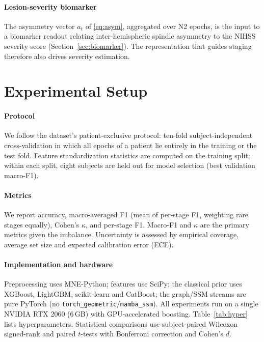\documentclass[journal]{IEEEtran}
\begin{document}
\paragraph{Lesion-severity biomarker}
The asymmetry vector $a_t$ of \eqref{eq:asym}, aggregated over N2 epochs, is the
input to a biomarker readout relating inter-hemispheric spindle asymmetry to the
NIHSS severity score (Section~\ref{sec:biomarker}). The representation that
guides staging therefore also drives severity estimation.

\section{Experimental Setup}
\label{sec:setup}

\paragraph{Protocol}
We follow the dataset's patient-exclusive protocol: ten-fold subject-independent
cross-validation in which all epochs of a patient lie entirely in the training or
the test fold. Feature standardization statistics are computed on the training
split; within each split, eight subjects are held out for model selection (best
validation macro-F1).

\paragraph{Metrics}
We report accuracy, macro-averaged F1 (mean of per-stage F1, weighting rare stages
equally), Cohen's $\kappa$, and per-stage F1. Macro-F1 and $\kappa$ are the primary
metrics given the imbalance. Uncertainty is assessed by empirical coverage, average
set size and expected calibration error (ECE).

\paragraph{Implementation and hardware}
Preprocessing uses MNE-Python; features use SciPy; the classical prior uses
XGBoost, LightGBM, scikit-learn and CatBoost; the graph/SSM streams are pure
PyTorch (no \texttt{torch\_geometric}/\texttt{mamba\_ssm}). All experiments run on a
single NVIDIA RTX 2060 (6\,GB) with GPU-accelerated boosting.
Table~\ref{tab:hyper} lists hyperparameters. Statistical comparisons use
subject-paired Wilcoxon signed-rank and paired $t$-tests with Bonferroni correction
and Cohen's $d$.
\end{document}
